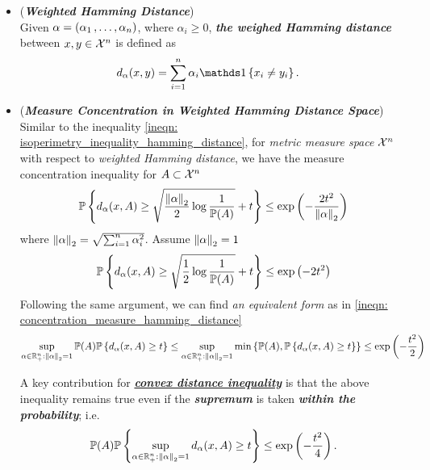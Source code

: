\documentclass[11pt]{article}
\begin{document}
\begin{itemize}
\item \begin{definition} (\textbf{\emph{Weighted Hamming Distance}}) \\
Given $\alpha = (\alpha_1 \,{,}\ldots{,}\, \alpha_n)$, where $\alpha_i  \ge 0$, \emph{\textbf{the weighed Hamming distance}} between $x , y \in {\mathcal X}^n$ is defined as
\begin{align*}
d_{\alpha}(x, y) &= \sum_{i=1}^{n}\alpha_i\ind{x_i \neq y_i}.
\end{align*}
\end{definition}

\item \begin{remark} (\textbf{\emph{Measure Concentration  in Weighted Hamming Distance Space}})\\
Similar to the inequality \eqref{ineqn: isoperimetry_inequality_hamming_distance}, for \emph{metric measure space} ${\mathcal X}^n$ with respect to \emph{weighted Hamming distance}, we have the measure concentration inequality for $A \subset {\mathcal X}^n$
\begin{align*}
{\mathbb P}\left\{d_{\alpha}(x, A) \ge \sqrt{\frac{\left\|\alpha\right\|_{2}}{2}\log \frac{1}{{\mathbb P}(A)}} + t\right\} \le \exp\left(-\frac{2t^2}{\left\|\alpha\right\|_{2}}\right)
\end{align*} where $\left\|\alpha\right\|_{2} = \sqrt{\sum_{i=1}^n \alpha_i^2}$.  Assume $\left\|\alpha\right\|_{2} = 1$
\begin{align*}
{\mathbb P}\left\{d_{\alpha}(x, A) \ge \sqrt{\frac{1}{2}\log \frac{1}{{\mathbb P}(A)}} + t\right\} \le \exp\left(-2t^2\right)
\end{align*}
Following the same argument, we can find \emph{an equivalent form} as in \eqref{ineqn: concentration_measure_hamming_distance}
\begin{align*}
\sup_{\alpha \in {\mathbb R}_{+}^{n}: \left\|\alpha\right\|_{2} = 1}{\mathbb P}(A){\mathbb P}\left\{d_{\alpha}(x, A) \ge t\right\} \le \sup_{\alpha \in {\mathbb R}_{+}^{n}: \left\|\alpha\right\|_{2} = 1}\min\left\{{\mathbb P}(A), {\mathbb P}\left\{d_{\alpha}(x, A) \ge t\right\}\right\} \le  \exp\left(-\frac{t^2}{2}\right)
\end{align*}

A key contribution for \underline{\emph{\textbf{convex distance inequality}}} is that  the above inequality remains true even if the \emph{\textbf{supremum}} is taken \emph{\textbf{within the probability}}; i.e. 
\begin{align*}
{\mathbb P}(A){\mathbb P}\left\{\sup_{\alpha \in {\mathbb R}_{+}^{n}: \left\|\alpha\right\|_{2} = 1}d_{\alpha}(x, A) \ge t\right\} \le  \exp\left(-\frac{t^2}{4}\right).
\end{align*}
\end{remark}


\end{itemize}
\end{document}
